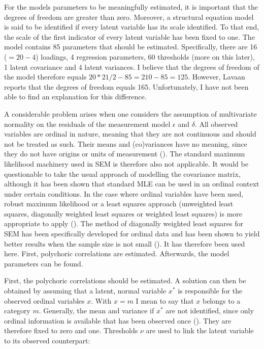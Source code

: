 \documentclass[11pt]{article}
\begin{document}

For the models parameters to be meaningfully estimated, it is important that the
degrees of freedom are greater than zero. Moreover, a structural equation model
is said to be identified if every latent variable has its scale identified. To
that end, the scale of the first indicator of every latent variable has been
fixed to one. The model contains 85 parameters that should be estimated.
Specifically, there are 16 ($=20 - 4$) loadings, 4 regression parameters, 60
thresholds (more on this later), 1 latent covariance and 4 latent variances. I
believe that the degrees of freedom of the model therefore equals $20*21/2 - 85
= 210 - 85 = 125$. However, Lavaan reports that the degrees of freedom equals
165. Unfortunately, I have not been able to find an explanation for this
difference.

A considerable problem arises when one considers the assumption of multivariate
normality on the residuals of the measurement model $\epsilon$ and $\delta$. All
observed variables are ordinal in nature, meaning that they are not continuous
and should not be treated as such. Their means and (co)variances have no
meaning, since they do not have origins or units of measurement
(\cite{joreskog1994}). The standard maximum likelihood machinery used in SEM is
therefore also not applicable. It would be questionable to take the usual
approach of modelling the covariance matrix, although it has been shown that
standard MLE can be used in an ordinal context under certain conditions. In the
case where ordinal variables have been used, robust maximum likelihood or a
least squares approach (unweighted least squares, diagonally weighted least
squares or weighted least squares) is more appropriate to apply
(\cite{yangwallentin2010}). The method of diagonally weighted least squares for
SEM has been specifically developed for ordinal data and has been shown to yield
better results when the sample size is not small (\cite{li2016}). It has
therefore been used here. First, polychoric correlations are estimated.
Afterwards, the model parameters can be found. 

First, the polychoric correlations should be estimated. A solution can then be
obtained by assuming that a latent, normal variable $x^*$ is responsible for the
observed ordinal variables $x$. With $x=m$ I mean to say that $x$ belongs to a
category $m$. Generally, the mean and variance if $x^*$ are not identified,
since only ordinal information is available that has been observed once
(\cite{simsek2012}). They are therefore fixed to zero and one. Thresholds $\nu$
are used to link the latent variable to its observed counterpart:
\end{document}
